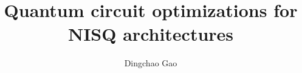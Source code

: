 \documentclass[aspectratio=1610]{beamer}
\title[a circuit synthesis]{Quantum circuit optimizations for NISQ architectures}
\author[Gcc]{Dingchao Gao}
\institute[ISCAS]{Institute of Software Chinese Academy of Sciences}
\begin{document}
\begin{frame}[plain]
  \titlepage
\end{frame}
\end{document}
